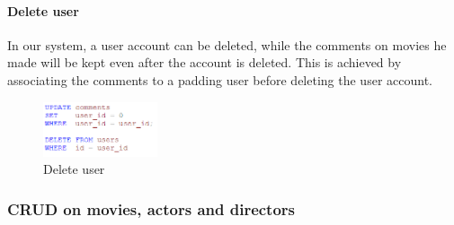 \begin{CJK*}{UTF8}{gbsn}
\paragraph{Delete user}
In our system, a user account can be deleted, while the comments on movies he made will be kept even after the account is deleted. This is achieved by associating the comments to a padding user before deleting the user account.
\begin{figure}[!htb]
    \centering
    \includegraphics[width=0.3\textwidth]{user_del.png}
    \caption{Delete user}
\end{figure}


\subsubsection{CRUD on movies, actors and directors}

\end{CJK*}
